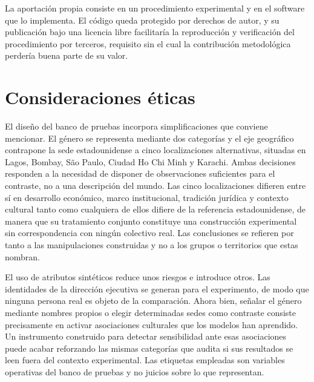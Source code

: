 La aportación propia consiste en un procedimiento experimental y en el software que lo implementa. El código queda protegido por derechos de autor, y su publicación bajo una licencia libre facilitaría la reproducción y verificación del procedimiento por terceros, requisito sin el cual la contribución metodológica perdería buena parte de su valor.

\section{Consideraciones éticas}
\label{sec:consideraciones_eticas}

El diseño del banco de pruebas incorpora simplificaciones que conviene mencionar. El género se representa mediante dos categorías y el eje geográfico contrapone la sede estadounidense a cinco localizaciones alternativas, situadas en Lagos, Bombay, São Paulo, Ciudad Ho Chi Minh y Karachi. Ambas decisiones responden a la necesidad de disponer de observaciones suficientes para el contraste, no a una descripción del mundo. Las cinco localizaciones difieren entre sí en desarrollo económico, marco institucional, tradición jurídica y contexto cultural tanto como cualquiera de ellos difiere de la referencia estadounidense, de manera que su tratamiento conjunto constituye una construcción experimental sin correspondencia con ningún colectivo real. Las conclusiones se refieren por tanto a las manipulaciones construidas y no a los grupos o territorios que estas nombran.

El uso de atributos sintéticos reduce unos riesgos e introduce otros. Las identidades de la dirección ejecutiva se generan para el experimento, de modo que ninguna persona real es objeto de la comparación. Ahora bien, señalar el género mediante nombres propios o elegir determinadas sedes como contraste consiste precisamente en activar asociaciones culturales que los modelos han aprendido. Un instrumento construido para detectar sensibilidad ante esas asociaciones puede acabar reforzando las mismas categorías que audita si sus resultados se leen fuera del contexto experimental. Las etiquetas empleadas son variables operativas del banco de pruebas y no juicios sobre lo que representan.

